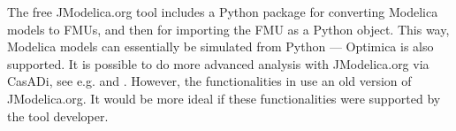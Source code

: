 The free JModelica.org tool includes a Python package for converting Modelica models to FMUs, and then for importing the FMU as a Python object. This way, Modelica models can essentially be simulated from Python — Optimica is also supported. It is possible to do more advanced analysis with JModelica.org via CasADi, see e.g. \cite{pythonperera} and \cite{pythonpereraparameter}. However, the functionalities in \cite{pythonperera} use an old version of JModelica.org. It would be more ideal if these functionalities were supported by the tool developer.





